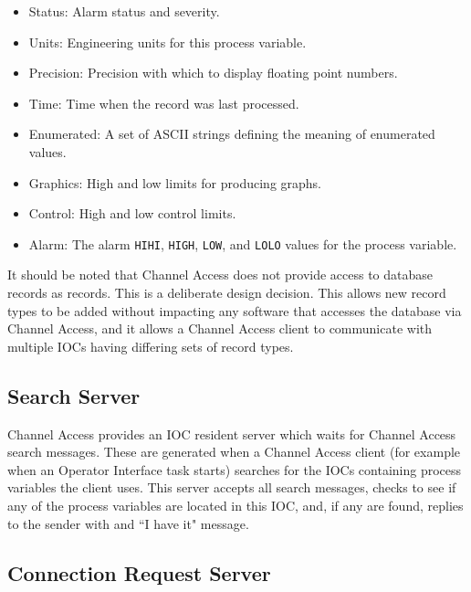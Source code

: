 \begin{itemize}\item Status:  Alarm status and severity.

\item Units:  Engineering units for this process variable.

\item Precision:  Precision with which to display floating point numbers.

\item Time:  Time when the record was last processed.

\item Enumerated:  A set of ASCII strings defining the meaning of enumerated values.

\item Graphics:  High and low limits for producing graphs.

\item Control:  High and low control limits.

\item Alarm:  The alarm \verb|HIHI|, \verb|HIGH|, \verb|LOW|, and \verb|LOLO| values for the process variable.

\end{itemize}It should be noted that Channel Access does not provide access to database records as records. This is a deliberate design 
decision. This allows new record types to be added without impacting any software that accesses the database via Channel 
Access, and it allows a Channel Access client to communicate with multiple IOCs having differing sets of record types.

\subsection{Search Server}

Channel Access provides an IOC resident server which waits for Channel Access search messages. These are generated 
when a Channel Access client (for example when an Operator Interface task starts) searches for the IOCs containing 
process variables the client uses. This server accepts all search messages, checks to see if any of the process variables are 
located in this IOC, and, if any are found, replies to the sender with and ``I have it" message.

\subsection{Connection Request Server}

